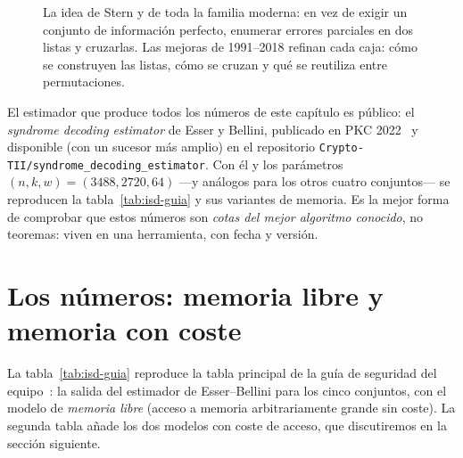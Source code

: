 \documentclass[11pt,a4paper,oneside]{report}
\begin{document}
\begin{figure}[htbp]
\centering
{}
\caption{La idea de Stern y de toda la familia moderna: en vez de
exigir un conjunto de información perfecto, enumerar errores
parciales en dos listas y cruzarlas. Las mejoras de 1991--2018
refinan cada caja: cómo se construyen las listas, cómo se cruzan y
qué se reutiliza entre permutaciones.}
\label{fig:isd-stern}
\end{figure}

\begin{practica}
El estimador que produce todos los números de este capítulo es
público: el \emph{syndrome decoding estimator} de Esser y Bellini,
publicado en PKC 2022~\cite{esserbellini2022} y disponible (con un
sucesor más amplio) en el repositorio
\texttt{Crypto-TII/syndrome\_decoding\_estimator}. Con él y los
parámetros $(n,k,w)=(3488,2720,64)$ ---y análogos para los otros
cuatro conjuntos--- se reproducen la tabla~\ref{tab:isd-guia} y sus
variantes de memoria. Es la mejor forma de comprobar que estos
números son \emph{cotas del mejor algoritmo conocido}, no teoremas:
viven en una herramienta, con fecha y versión.
\end{practica}

\section{Los números: memoria libre y memoria con coste}

La tabla~\ref{tab:isd-guia} reproduce la tabla principal de la guía de
seguridad del equipo~\cite{cmsecurity}: la salida del estimador de
Esser--Bellini para los cinco conjuntos, con el modelo de
\emph{memoria libre} (acceso a memoria arbitrariamente grande sin
coste). La segunda tabla añade los dos modelos con coste de acceso,
que discutiremos en la sección siguiente.
\end{document}
